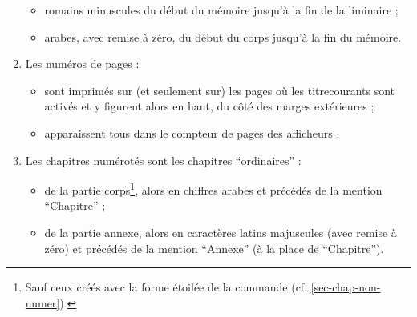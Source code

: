 \begin{enumerate}
  \begin{itemize}
  \item romains minuscules du début du mémoire jusqu'à la fin de la
    \gls{liminaire} ;
  \item arabes, avec remise à zéro, du début du corps jusqu'à la fin du
    mémoire.
  \end{itemize}
\item Les numéros de pages :
  \begin{itemize}
  \item sont imprimés sur (et seulement sur) les pages où les
    \glspl{titrecourant} sont activés et y figurent alors en haut, du côté des
    marges extérieures ;
  \item apparaissent tous dans le compteur de pages des afficheurs
    \pdf{}.
  \end{itemize}
\item Les chapitres numérotés sont les chapitres \enquote{ordinaires} :
  \begin{itemize}
  \item de la partie corps\footnote{Sauf ceux créés avec la forme étoilée de la
      commande  (cf. \vref{sec-chap-non-numer}).}, alors
    en chiffres arabes et précédés de la mention \enquote{Chapitre} ;
  \item de la partie annexe, alors en caractères latins majuscules (avec remise
    à zéro) et précédés de la mention \enquote{Annexe} (à la place de \enquote{Chapitre}).
  \end{itemize}
\end{enumerate}


